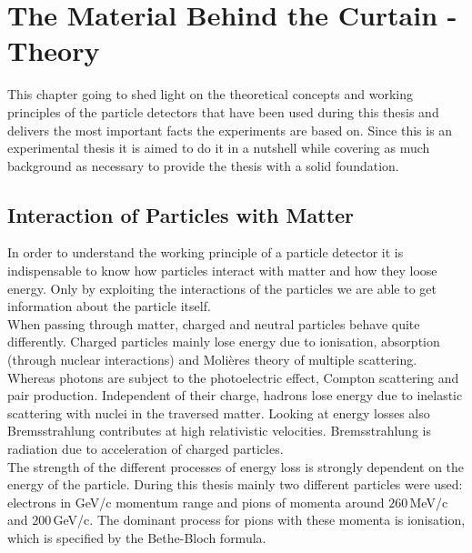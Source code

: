 \documentclass[british,11pt,a4paper]{memoir}
\begin{document}
\chapter{The Material Behind the Curtain - Theory}
This chapter going to shed light on the theoretical concepts and working principles of the particle detectors that have been used during this thesis and delivers the most important facts the experiments are based on. Since this is an experimental thesis it is aimed to do it in a nutshell while covering as much background as necessary to provide the thesis with a solid foundation.
\section{Interaction of Particles with Matter}
In order to understand the working principle of a particle detector it is indispensable to know how particles interact with matter and how they loose energy. Only by exploiting the interactions of the particles we are able to get information about the particle itself.\\
When passing through matter, charged and neutral particles behave quite differently. Charged particles mainly lose energy due to ionisation, absorption (through nuclear interactions) and Moli\`eres theory of multiple scattering. Whereas photons are subject to the photoelectric effect, Compton scattering and pair production. Independent of their charge, hadrons lose energy due to inelastic scattering with nuclei in the traversed matter. Looking at energy losses also Bremsstrahlung contributes at high relativistic velocities. Bremsstrahlung is radiation due to acceleration of charged particles.\\
The strength of the different processes of energy loss is strongly dependent on the energy of the particle. During this thesis mainly two different particles were used: electrons in GeV/c momentum range and pions of momenta around $260\,$MeV/c and $200\,$GeV/c. The dominant process for pions with these momenta is ionisation, which is specified by the Bethe-Bloch formula.
\end{document}
